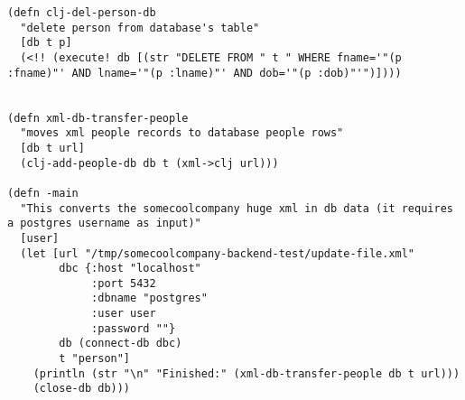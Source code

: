 \documentclass[11pt]{article}
\begin{document}
\begin{verbatim}
(defn clj-del-person-db
  "delete person from database's table"
  [db t p]
  (<!! (execute! db [(str "DELETE FROM " t " WHERE fname='"(p :fname)"' AND lname='"(p :lname)"' AND dob='"(p :dob)"'")])))


(defn xml-db-transfer-people
  "moves xml people records to database people rows"
  [db t url]
  (clj-add-people-db db t (xml->clj url)))

(defn -main
  "This converts the somecoolcompany huge xml in db data (it requires a postgres username as input)"
  [user]
  (let [url "/tmp/somecoolcompany-backend-test/update-file.xml"
        dbc {:host "localhost" 
             :port 5432 
             :dbname "postgres" 
             :user user 
             :password ""}
        db (connect-db dbc)
        t "person"]
    (println (str "\n" "Finished:" (xml-db-transfer-people db t url)))
    (close-db db)))
\end{verbatim}
\end{document}

